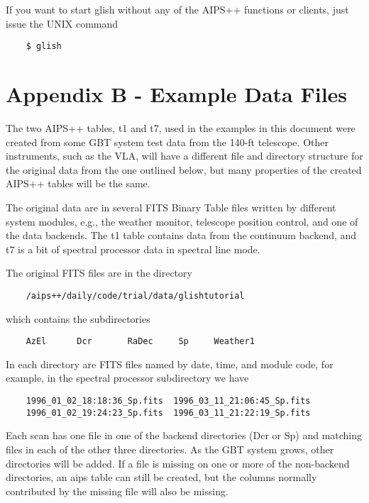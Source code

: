     If you want to start glish without any of the AIPS++ functions or
clients, just issue the UNIX command

\begin{verbatim}
	$ glish
\end{verbatim}

\section{Appendix B - Example Data Files}

    The two AIPS++ tables, t1 and t7, used in the examples in this document
were created from some GBT system test data from the 140-ft telescope.
Other instruments, such as the VLA, will have a different file and
directory structure for the original data from the one outlined below, but
many properties of the created AIPS++ tables will be the same.

    The original data are in several FITS Binary Table files written by
different system modules, e.g., the weather monitor, telescope position
control, and one of the data backends.  The t1 table contains data from the
continuum backend, and t7 is a bit of spectral processor data in spectral
line mode.

    The original FITS files are in the directory

\begin{verbatim}
	/aips++/daily/code/trial/data/glishtutorial
\end{verbatim}

which contains the subdirectories

\begin{verbatim}
	AzEl      Dcr       RaDec     Sp     Weather1
\end{verbatim}

    In each directory are FITS files named by date, time, and module code,
for example, in the spectral processor subdirectory we have

\begin{verbatim}
	1996_01_02_18:18:36_Sp.fits  1996_03_11_21:06:45_Sp.fits
	1996_01_02_19:24:23_Sp.fits  1996_03_11_21:22:19_Sp.fits
\end{verbatim}

    Each scan has one file in one of the backend directories (Dcr or Sp)
and matching files in each of the other three directories.  As the GBT
system grows, other directories will be added.  If a file is missing on one
or more of the non-backend directories, an aips table can still be created,
but the columns normally contributed by the missing file will also be
missing.

